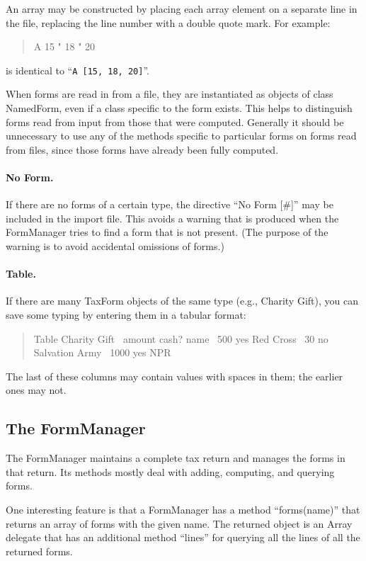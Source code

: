 \documentclass[12pt]{article}
\begin{document}
An array may be constructed by placing each array element on a separate line in
the file, replacing the line number with a double quote mark. For example:
\begin{quote}
\ttfamily\obeylines\obeyspaces
A   15
"   18
"   20
\end{quote}
is identical to ``\texttt{A [15, 18, 20]}''.

When forms are read in from a file, they are instantiated as objects of class
NamedForm, even if a class specific to the form exists. This helps to
distinguish forms read from input from those that were computed. Generally it
should be unnecessary to use any of the methods specific to particular forms on
forms read from files, since those forms have already been fully computed.

\paragraph{No Form.} If there are no forms of a certain type, the directive ``No
Form [\#]'' may be included in the import file. This avoids a warning that is
produced when the FormManager tries to find a form that is not present. (The
purpose of the warning is to avoid accidental omissions of forms.)

\paragraph{Table.} If there are many TaxForm objects of the same type (e.g.,
Charity Gift), you can save some typing by entering them in a tabular format:
\begin{quote}
\ttfamily\obeylines\frenchspacing\obeyspaces
Table Charity Gift
\    amount   cash?   name
\    500      yes     Red Cross
\    30       no      Salvation Army
\    1000     yes     NPR
\end{quote}
The last of these columns may contain values with spaces in them; the earlier
ones may not.


\subsection{The FormManager}

The FormManager maintains a complete tax return and manages the forms in that
return. Its methods mostly deal with adding, computing, and querying forms.

One interesting feature is that a FormManager has a method ``forms(name)'' that
returns an array of forms with the given name. The returned object is an Array
delegate that has an additional method ``lines'' for querying all the lines of
all the returned forms.
\end{document}
